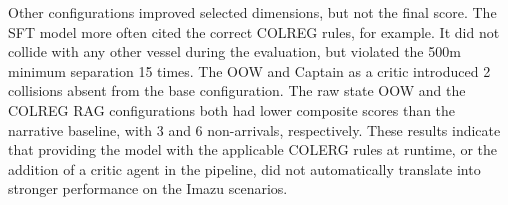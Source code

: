 \documentclass[10pt]{reportMaster}
\begin{document}
Other configurations improved selected dimensions, but not the final score. The SFT model more often cited the correct COLREG rules, for example. It did not collide with any other vessel during the evaluation, but violated the 500m minimum separation 15 times. The OOW and Captain as a critic introduced 2 collisions absent from the base configuration. The raw state OOW and the COLREG RAG configurations both had lower composite scores than the narrative baseline, with 3 and 6 non-arrivals, respectively. These results indicate that providing the model with the applicable COLERG rules at runtime, or the addition of a critic agent in the pipeline, did not automatically translate into stronger performance on the Imazu scenarios.

\begin{table}[t]
\centering
\caption{Frozen composite scores across all 22 IMAZU
scenarios for the evaluated controllers.}
\label{tab:imazu-composite-scores}
\begin{threeparttable}

\scriptsize
\setlength{\tabcolsep}{3pt}
\renewcommand{\arraystretch}{1.1}

\end{threeparttable}
\end{table}
\end{document}

